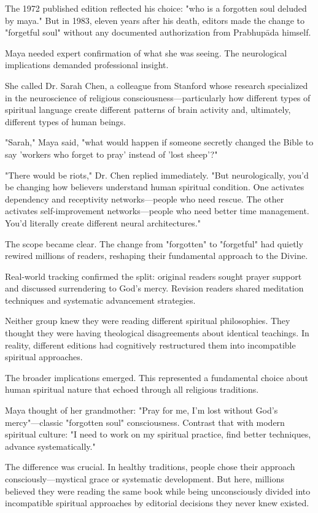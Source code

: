 \documentclass[11pt,twoside]{book}
\begin{document}
The 1972 published edition reflected his choice: "who is a forgotten soul deluded by maya." But in 1983, eleven years after his death, editors made the change to "forgetful soul" without any documented authorization from Prabhupāda himself.

Maya needed expert confirmation of what she was seeing. The neurological implications demanded professional insight.

She called Dr. Sarah Chen, a colleague from Stanford whose research specialized in the neuroscience of religious consciousness—particularly how different types of spiritual language create different patterns of brain activity and, ultimately, different types of human beings.

"Sarah," Maya said, "what would happen if someone secretly changed the Bible to say 'workers who forget to pray' instead of 'lost sheep'?"

"There would be riots," Dr. Chen replied immediately. "But neurologically, you'd be changing how believers understand human spiritual condition. One activates dependency and receptivity networks—people who need rescue. The other activates self-improvement networks—people who need better time management. You'd literally create different neural architectures."

The scope became clear. The change from "forgotten" to "forgetful" had quietly rewired millions of readers, reshaping their fundamental approach to the Divine.

Real-world tracking confirmed the split: original readers sought prayer support and discussed surrendering to God's mercy. Revision readers shared meditation techniques and systematic advancement strategies.

Neither group knew they were reading different spiritual philosophies. They thought they were having theological disagreements about identical teachings. In reality, different editions had cognitively restructured them into incompatible spiritual approaches.

The broader implications emerged. This represented a fundamental choice about human spiritual nature that echoed through all religious traditions.

Maya thought of her grandmother: "Pray for me, I'm lost without God's mercy"—classic "forgotten soul" consciousness. Contrast that with modern spiritual culture: "I need to work on my spiritual practice, find better techniques, advance systematically."

The difference was crucial. In healthy traditions, people chose their approach consciously—mystical grace or systematic development. But here, millions believed they were reading the same book while being unconsciously divided into incompatible spiritual approaches by editorial decisions they never knew existed.
\end{document}
